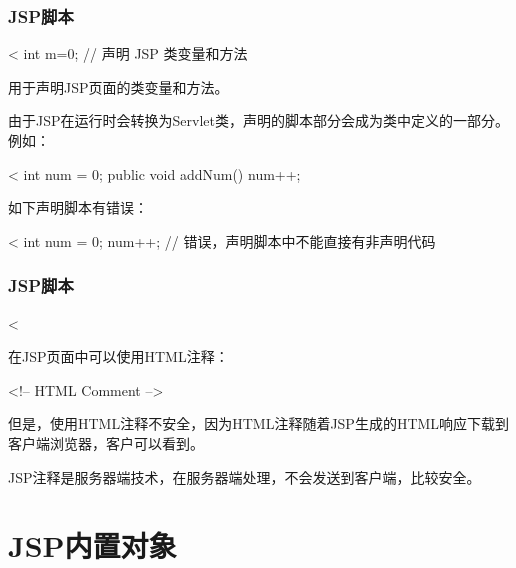 \begin{frame}[fragile] %
  \frametitle{JSP脚本}


  \begin{jspCode}
    <%
      int m=0; // 声明 JSP 类变量和方法
\end{jspCode}

用于声明JSP页面的类变量和方法。

由于JSP在运行时会转换为Servlet类，声明的脚本部分会成为类中定义的一部分。
例如：
\begin{jspCode}
<%
  int num = 0;
  public void addNum() {
    num++;
  }
\end{jspCode}
如下声明脚本有错误：
\begin{jspCode}
<%
  int num = 0;
  num++; // 错误，声明脚本中不能直接有非声明代码
\end{jspCode}
\end{frame}

\begin{frame}[fragile] %
  \frametitle{JSP脚本}


  \begin{jspCode}
    <%
  \end{jspCode}

  在JSP页面中可以使用HTML注释：

  \begin{jspCode}
    <!-- HTML Comment -->
  \end{jspCode}

  {\kai\Red 但是，使用HTML注释不安全，因为HTML注释随着JSP生成的HTML响应下载到客户端浏览器，客户可以看到。}

  JSP注释是服务器端技术，在服务器端处理，不会发送到客户端，比较安全。

\end{frame}

\section{JSP内置对象} 

